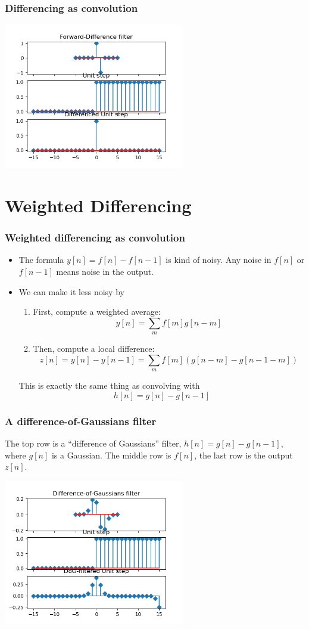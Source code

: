 \documentclass{beamer}
\begin{document}
\begin{frame}
  \frametitle{Differencing as convolution} 
  \centerline{\includegraphics[height=2.5in]{mp3fig5.png}}
\end{frame}
  
\section[Weighted]{Weighted Differencing}
\setcounter{subsection}{1}

\begin{frame}
  \frametitle{Weighted differencing as convolution}
  \begin{itemize}
    \item 
      The formula $y[n]=f[n]-f[n-1]$ is kind of noisy.  Any noise in
      $f[n]$ or $f[n-1]$ means noise in the output.
    \item
      We can make it less noisy  by
      \begin{enumerate}
      \item First, compute a weighted average:
        \[
        y[n] = \sum_m f[m]g[n-m]
        \]
      \item Then, compute a local difference:
        \[
        z[n] = y[n] - y[n-1] = \sum_m f[m]\left(g[n-m]-g[n-1-m]\right)
        \]
      \end{enumerate}
      This is exactly the same thing as convolving with
      \[
      h[n] = g[n]-g[n-1]
      \]
  \end{itemize}
\end{frame}

\begin{frame}
  \frametitle{A difference-of-Gaussians filter}

  The top row is a ``difference of Gaussians'' filter,
  $h[n]=g[n]-g[n-1]$, where $g[n]$ is a Gaussian.  The middle row is
  $f[n]$, the last row is the output $z[n]$.
  \centerline{\includegraphics[height=2.5in]{mp3fig7.png}}
\end{frame}
\end{document}
